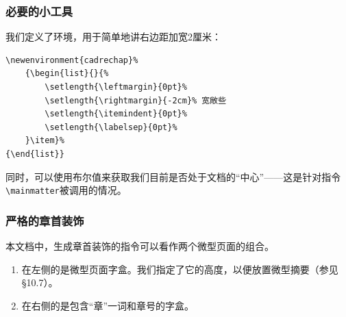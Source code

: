 \subsubsection{必要的小工具}

我们定义了环境，用于简单地讲右边距加宽2厘米：

\begin{dmd}
\begin{verbatim}
\newenvironment{cadrechap}% 
    {\begin{list}{}{%
        \setlength{\leftmargin}{0pt}% 
        \setlength{\rightmargin}{-2cm}% 宽敞些
        \setlength{\itemindent}{0pt}% 
        \setlength{\labelsep}{0pt}%
    }\item}% 
{\end{list}}\end{verbatim}
\end{dmd}

同时，可以使用布尔值来获取我们目前是否处于文档的“中心”——这是针对指令\verb|\mainmatter|被调用的情况。

\subsubsection{严格的章首装饰}

本文档中，生成章首装饰的指令可以看作两个微型页面的组合。%

\begin{enumerate}
    \item 在左侧的是微型页面字盒。我们指定了它的高度，以便放置微型摘要（参见\S 10.7）。
    \item 在右侧的是包含“章”一词和章号的字盒。
\end{enumerate}

\newcommand{\boite}[1]{%
  {\setlength{\fboxrule}{.2pt}%
    \setlength{\fboxsep}{-\fboxrule}%
    \fbox{#1}}}

\newcommand{\fairechapitre}[1]{%
  \noindent\begin{minipage}{\linewidth}%
      \boite{\begin{minipage}[t][3cm][c]{.75\textwidth}%
          \centering%
          为\\微型摘要\\准备的\\微型页面
        \end{minipage}}%
      \boite{\begin{minipage}[t]{.25\textwidth}
          \begin{flushright}
            {\fnomfont\chaptername}\\[.5cm]
            {\fnumfont\thechapter}
          \end{flushright}
        \end{minipage}}
    \end{minipage}\par
  \begin{flushright}\ftitrefont#1\end{flushright}}

